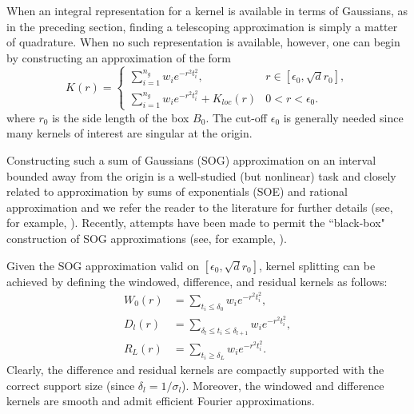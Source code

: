 \documentclass[final,letterpaper]{siamart171218}
\newcommand{\be}{\begin{equation}}
\newcommand{\ee}{\end{equation}}
\newcommand{\ba}{\begin{aligned}}
\newcommand{\ea}{\end{aligned}}
\begin{document}
When an integral representation for a kernel is available in terms of Gaussians,
as in the preceding section, finding a telescoping approximation is simply a matter of
quadrature. When no such representation is available, however, one can begin
by constructing an approximation of the form 
\be\label{sogapproximation}
K(r)=
\begin{cases}
\sum_{i=1}^{n_g} w_i e^{-r^2t^2_i}, & r\in [\epsilon_0,\sqrt{d}r_0], \\
\sum_{i=1}^{n_g} w_i e^{-r^2t^2_i} + K_{loc}(r) & 0 < r < \epsilon_0. 
\end{cases}
\ee
where $r_0$ is the side length of the box $B_0$. The cut-off $\epsilon_0$ is generally 
needed since many kernels of interest are singular at the origin.

Constructing such a sum of Gaussians (SOG) approximation on an interval bounded away from the
origin is a well-studied (but nonlinear) task and
closely related to approximation
by sums of exponentials (SOE) and rational approximation and we refer the reader to 
the literature for further details (see, for example,
\cite{beylkin2010acha,glover1984ijc,jiang2013jsc}).
Recently, attempts have been made to permit the ``black-box" construction of SOG approximations
(see, for example, \cite{gao2022jsc,greengard2018sisc}).

Given the SOG approximation valid on $[\epsilon_0,\sqrt{d} r_0]$,
kernel splitting can be achieved by defining the
windowed, difference, and residual kernels as follows:
\be\label{sogkernels}
\ba
W_0(r) &= \sum_{t_i\le \delta_0} w_i e^{-r^2t^2_i},\\ 
D_l(r) &= \sum_{\delta_l\le t_i\le \delta_{l+1}} w_i e^{-r^2t^2_i},\\ 
R_L(r) &= \sum_{t_i\ge \delta_L} w_i e^{-r^2t^2_i}. 
\ea
\ee
Clearly, the difference and residual kernels are compactly supported with the
correct support size (since $\delta_l = 1/\sigma_l$). 
Moreover, the windowed and difference kernels are smooth and admit
efficient Fourier approximations. 
\end{document}
